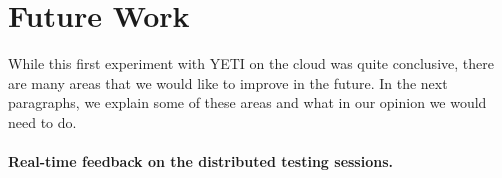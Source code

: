 \section{Future Work}\label{sec:fut}

While this first experiment with YETI on the cloud was quite 
conclusive, there are many areas that we would like to improve 
in the future. In the next paragraphs, we explain some of these 
areas and what in our opinion we would need to do.

\paragraph{Real-time feedback on the distributed testing sessions.}

\paragraph{}